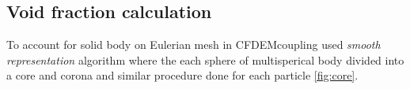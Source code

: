 \subsection{Void fraction calculation}

To account for solid body on Eulerian mesh in CFDEMcoupling \cite{kloss2012models} used \textit{smooth representation} \cite{kloss2012models} algorithm where the each sphere of multisperical body divided into a core and corona and similar procedure done for each particle \ref{fig:core}. 







